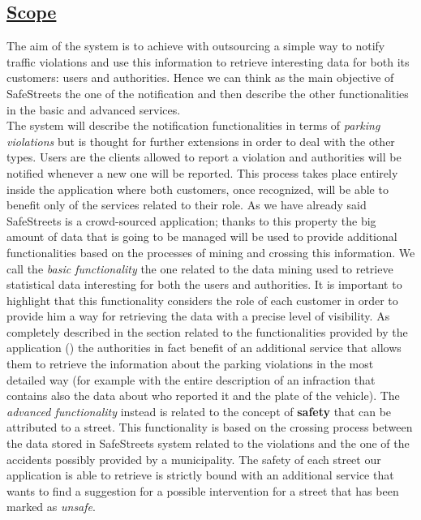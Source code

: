 \subsection[Scope]{\hyperlink{toc}{Scope}}
	The aim of the system is to achieve with outsourcing a simple way to notify traffic violations and use this information to retrieve interesting data for both its customers: users and authorities. Hence we can think as the main objective of SafeStreets the one of the notification and then describe the other functionalities in the basic and advanced services.\\
	
	The system will describe the notification functionalities in terms of \emph{parking violations} but is thought for further extensions in order to deal with the other types. Users are the clients allowed to report a violation and authorities will be notified whenever a new one will be reported. This process takes place entirely inside the application where both customers, once recognized, will be able to benefit only of the services related to their role. As we have already said SafeStreets is a crowd-sourced application; thanks to this property the big amount of data that is going to be managed will be used to provide additional functionalities based on the processes of mining and crossing this information. We call the \emph{basic functionality} the one related to the data mining used to retrieve statistical data interesting for both the users and authorities. It is important to highlight that this functionality considers the role of each customer in order to provide him a way for retrieving the data with a precise level of visibility. As completely described in the section related to the functionalities provided by the application () the authorities in fact benefit of an additional service that allows them to retrieve the information about the parking violations in the most detailed way (for example with the entire description of an infraction that contains also the data about who reported it and the plate of the vehicle). The \emph{advanced functionality} instead is related to the concept of \textbf{safety} that can be attributed to a street. This functionality is based on the crossing process between the data stored in SafeStreets system related to the violations and the one of the accidents possibly provided by a municipality. The safety of each street our application is able to retrieve is strictly bound with an additional service that wants to find a suggestion for a possible intervention for a street that has been marked as \emph{unsafe}.\\
	
